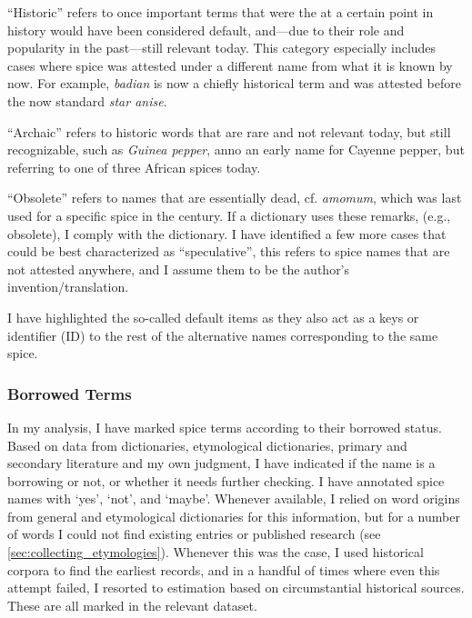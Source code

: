 ``Historic'' refers to once important terms that were the at a certain point in history would have been considered default, and---due to their role and popularity in the past---still relevant today. This category especially includes cases where spice was attested under a different name from what it is known by now. For example, \textit{badian} is now a chiefly historical term and was attested before the now standard \textit{star anise}.  

``Archaic'' refers to historic words that are rare and not relevant today, but still recognizable, such as \textit{Guinea pepper}, anno an early name for Cayenne pepper, but referring to one of three African spices today.

``Obsolete'' refers to names that are essentially dead, cf. \textit{amomum}, which was last used for a specific spice in the  century. If a dictionary uses these remarks, (e.g., obsolete), I comply with the dictionary. 
I have identified a few more cases that could be best characterized as ``speculative'', this refers to spice names that are not attested anywhere, and I assume them to be the author's invention/translation. %

I have highlighted the so-called default items as they also act as a keys or identifier (ID) to the rest of the alternative names corresponding to the same spice.

\subsubsection{Borrowed Terms}
\label{sec:borrowed}

In my analysis, I have marked spice terms according to their borrowed status. Based on data from dictionaries, etymological dictionaries, primary and secondary literature and my own judgment, I have indicated if the name is a borrowing or not, or whether it needs further checking. I have annotated spice names with `yes', `not', and `maybe'. Whenever available, I relied on word origins from general and etymological dictionaries for this information, but for a number of words I could not find existing entries or published research (see \cref{sec:collecting_etymologies}). Whenever this was the case, I used historical corpora to find the earliest records, and in a handful of times where even this attempt failed, I resorted to estimation based on circumstantial historical sources. These are all marked in the relevant dataset.

